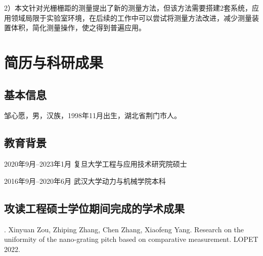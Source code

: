 \documentclass[type=master,oneside]{fduthesis}
\begin{document}
2）本文针对光栅栅距的测量提出了新的测量方法，但该方法需要搭建2套系统，应用领域局限于实验室环境，在后续的工作中可以尝试将测量方法改进，减少测量装置体积，简化测量操作，使之得到普遍应用。



\backmatter

\printbibliography

\chapter*{简历与科研成果}

\section*{基本信息}

\noindent 邹心愿，男，汉族，1998年11月出生，湖北省荆门市人。

\section*{教育背景}

\noindent 2020年9月--2023年1月 \quad 复旦大学工程与应用技术研究院\quad \quad\quad\quad\quad\quad\quad\quad\quad\quad\quad 硕士

\noindent 2016年9月--2020年6月 \quad 武汉大学动力与机械学院\quad \quad\quad\quad\quad\quad\quad\quad\quad\quad\quad\quad\quad\quad 本科

\section*{攻读工程硕士学位期间完成的学术成果}

. Xinyuan Zou, Zhiping Zhang, Chen Zhang, Xiaofeng Yang. Research on the uniformity of the nano-grating pitch based on comparative measurement. LOPET 2022.
\end{document}
